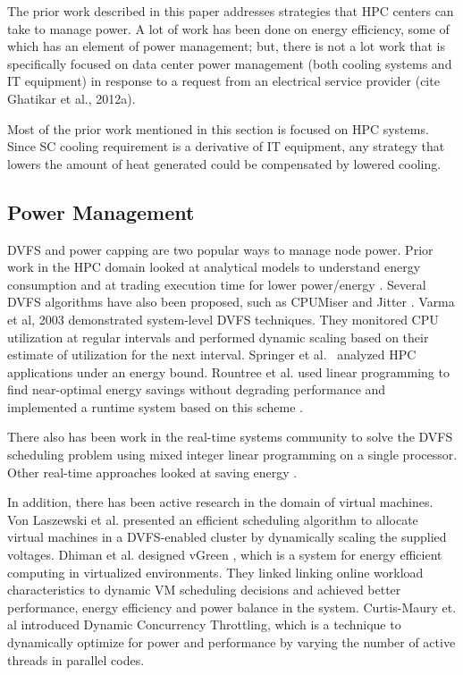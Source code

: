 The prior work described in this paper addresses strategies
that HPC centers can take to manage power. A lot of work has been done on
energy efficiency, some of which has an element of power management; but,
there is not a lot work that is specifically focused on data center power management (both cooling systems and IT equipment) in
response to a request from an electrical service provider %
(cite Ghatikar et al., 2012a).

Most of the prior work mentioned in this section is focused on HPC systems. 
Since SC cooling requirement is a derivative of IT equipment, any strategy that lowers the amount of heat generated could be compensated by lowered cooling.


\subsection{Power Management}

DVFS and power capping are two popular ways to manage node power. Prior work in the HPC domain looked at analytical models to understand energy consumption \cite{SpringerPPoPP2006,GeICPP2007,LiHPCA2006} and at trading execution time for lower power/energy \cite{CameronSC2005,HsuSC2005}. Several DVFS algorithms have also been proposed, such as CPUMiser \cite{GeICPP2007} and Jitter \cite{KappiahSC2005}. Varma et al, 2003 \cite{varma_control-theoretic_2003} demonstrated system-level DVFS techniques. They monitored CPU utilization at regular intervals and performed dynamic scaling based on their estimate of utilization for the next interval. Springer et al.~\cite{springer:06} analyzed HPC applications under an energy bound. Rountree et al. used linear programming to find near-optimal energy savings without degrading performance \cite{rountree:07} and implemented a runtime system based on this scheme \cite{rountree:09}. 

There also has been work in the real-time systems community to solve the DVFS scheduling problem using mixed integer linear programming on a single processor\cite{IshiharaISLPED1998,SaputraLCTES2002,SwaminathanRTSS2000,SwaminathanASPDAC2001}. Other real-time approaches looked at saving energy \cite{MoncusiRTSS2003,MochockiICCAD2002,MochockiRTAS2005,ZhuTPDS2003,ZhangDAC2002}. 

In addition, there has been active research in the domain of virtual machines. Von Laszewski et al. \cite{von_laszewski_power-aware_2009} presented an efficient scheduling algorithm to allocate virtual machines in a DVFS-enabled cluster by
dynamically scaling the supplied voltages. Dhiman et al. designed vGreen \cite{dhiman_vgreen:_2009}, which is a system for energy efficient computing in
virtualized environments. They linked linking online workload characteristics to dynamic VM scheduling decisions and achieved better performance, energy
efficiency and power balance in the system. Curtis-Maury et. al \cite{Curtis1,Curtis2,Curtis3} introduced Dynamic Concurrency Throttling, which is a technique to dynamically optimize for power and performance by varying the number of active threads in parallel codes. 

